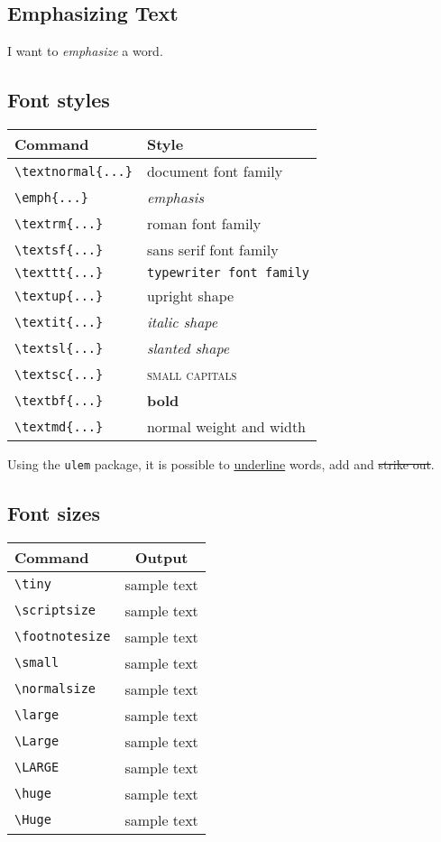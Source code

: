 \documentclass[english]{article}
\begin{document}
\subsection{Emphasizing Text}

I want to \emph{emphasize} a word.

\subsection{Font styles}

\begin{tabular}{| l | l |}
\hline
Command & Style \\
\hline
\verb|\textnormal{...}| & \textnormal{document font family} \\ \hline
\verb|\emph{...}| & \emph{emphasis} \\ \hline
\verb|\textrm{...}| & \textrm{roman font family} \\ \hline
\verb|\textsf{...}| & \textsf{sans serif font family} \\ \hline
\verb|\texttt{...}| & \texttt{typewriter font family} \\ \hline
\verb|\textup{...}| & \textup{upright shape} \\ \hline
\verb|\textit{...}| & \textit{italic shape} \\ \hline
\verb|\textsl{...}| & \textsl{slanted shape} \\ \hline
\verb|\textsc{...}| & \textsc{small capitals} \\ \hline
\verb|\textbf{...}| & \textbf{bold} \\ \hline
\verb|\textmd{...}| & \textmd{normal weight and width} \\
\hline
\end{tabular}

\vspace{\baselineskip}

Using the \texttt{ulem} package, it is possible to \uline{underline}
words, add  and \sout{strike out}.

\subsection{Font sizes}

\begin{tabular}{| l | c |}
\hline
Command & Output \\
\hline
\verb|\tiny| & \tiny{sample text} \\
\verb|\scriptsize| & \scriptsize{sample text} \\
\verb|\footnotesize| & \footnotesize{sample text} \\
\verb|\small| & \small{sample text} \\
\verb|\normalsize| & \normalsize{sample text} \\
\verb|\large| & \large{sample text} \\
\verb|\Large| & \Large{sample text} \\
\verb|\LARGE| & \LARGE{sample text} \\
\verb|\huge| & \huge{sample text} \\
\verb|\Huge| & \Huge{sample text} \\
\hline
\end{tabular}
\end{document}
